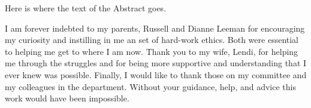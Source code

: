 \documentclass[11pt]{psuthesis}
\begin{document}
\begin{frontmatter}


\begin{doublespace}
\titlepage
\end{doublespace}

\committeepage

\abstract

Here is where the text of the Abstract goes.







\tables


\acknowledgments  %

I am forever indebted to my parents, Russell and Dianne Leeman for encouraging my curiosity and instilling in me an set of hard-work ethics. Both were essential to helping me get to where I am now. Thank you to my wife, Lendi, for helping me through the struggles and for being more supportive and understanding that I ever knew was possible. Finally, I would like to thank those on my committee and my colleagues in the department. Without your guidance, help, and advice this work would have been impossible.



\end{frontmatter}
\end{document}

